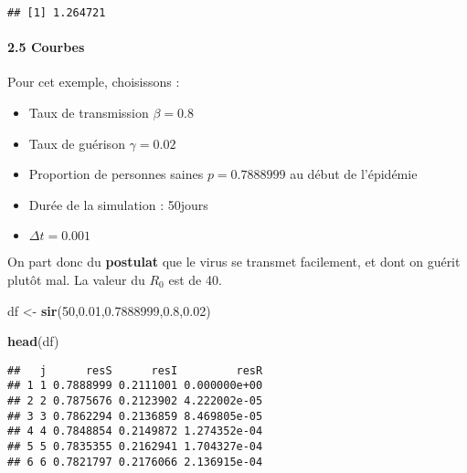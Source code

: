 \documentclass[
]{article}
\newenvironment{Shaded}{\begin{snugshade}}{\end{snugshade}}
\newcommand{\DecValTok}[1]{\textcolor[rgb]{0.00,0.00,0.81}{#1}}
\newcommand{\FloatTok}[1]{\textcolor[rgb]{0.00,0.00,0.81}{#1}}
\newcommand{\KeywordTok}[1]{\textcolor[rgb]{0.13,0.29,0.53}{\textbf{#1}}}
\newcommand{\NormalTok}[1]{#1}
\newcommand{\StringTok}[1]{\textcolor[rgb]{0.31,0.60,0.02}{#1}}
\providecommand{\tightlist}{%
  \setlength{\itemsep}{0pt}\setlength{\parskip}{0pt}}
\begin{document}
\begin{verbatim}
## [1] 1.264721
\end{verbatim}

\hypertarget{courbes}{%
\paragraph{2.5 Courbes}\label{courbes}}

Pour cet exemple, choisissons :

\begin{itemize}
\tightlist
\item
  Taux de transmission \(\beta = 0.8\)
\item
  Taux de guérison \(\gamma=0.02\)
\item
  Proportion de personnes saines \(p=0.7888999\) au début de l'épidémie
\item
  Durée de la simulation : 50jours
\item
  \(\Delta t= 0.001\)
\end{itemize}

On part donc du \textbf{postulat} que le virus se transmet facilement,
et dont on guérit plutôt mal. La valeur du \(R_0\) est de 40.

\begin{Shaded}
\begin{Highlighting}[]
\NormalTok{df <-}\StringTok{ }\KeywordTok{sir}\NormalTok{(}\DecValTok{50}\NormalTok{,}\FloatTok{0.01}\NormalTok{,}\FloatTok{0.7888999}\NormalTok{,}\FloatTok{0.8}\NormalTok{,}\FloatTok{0.02}\NormalTok{)}

\KeywordTok{head}\NormalTok{(df)}
\end{Highlighting}
\end{Shaded}

\begin{verbatim}
##   j      resS      resI         resR
## 1 1 0.7888999 0.2111001 0.000000e+00
## 2 2 0.7875676 0.2123902 4.222002e-05
## 3 3 0.7862294 0.2136859 8.469805e-05
## 4 4 0.7848854 0.2149872 1.274352e-04
## 5 5 0.7835355 0.2162941 1.704327e-04
## 6 6 0.7821797 0.2176066 2.136915e-04
\end{verbatim}
\end{document}
